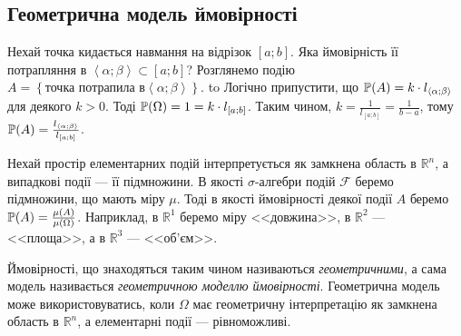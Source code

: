 \subsection{Геометрична модель ймовірності}
\begin{example}
    Нехай точка кидається навмання на відрізок $\left[a; b\right]$. 
    Яка ймовірність її 
    потрапляння в $\left<\alpha; \beta\right> \subset  \left[a; b\right]$?
    Розглянемо подію $A = \left\{ 
        \text{точка потрапила в} \left<\alpha; \beta\right>
    \right\}$.
    \newline
    \hbox to 
    Логічно припустити, що $\P(A) = k\cdot l_{\left<\alpha; \beta\right>}$ для деякого $k > 0$.
    Тоді $\P(\Omega) = 1 = k\cdot l_{\left[a; b\right]}$. Таким чином, 
    $k = \frac{1}{l_{\left[a; b\right]}} = \frac{1}{b-a}$,
    тому $\P(A) = \frac{l_{\left<\alpha; \beta\right>}}{l_{\left[a; b\right]}}$.
\end{example}
Нехай простір елементарних подій інтерпретується як замкнена область в 
$ \mathbb{R} ^n$, а випадкові події --- її підмножини. В якості $\sigma$-алгебри 
подій $\mathcal{F}$ беремо підмножини, що мають міру $\mu$. Тоді в якості ймовірності 
деякої події $A$ беремо $\P(A) = \frac{\mu(A)}{\mu(\Omega)}$. 
Наприклад, в $\mathbb{R}^1$ беремо міру <<довжина>>, в $\mathbb{R}^2$ --- <<площа>>, а в $\mathbb{R}^3$ --- <<об'єм>>.

Ймовірності, що знаходяться таким чином називаються \emph{геометричними}, а сама модель 
називається \emph{геометричною моделлю ймовірності}.
Геометрична модель може використовуватись, 
коли $\Omega$ має геометричну інтерпретацію як замкнена область в $\mathbb{R}^n$,
а елементарні події --- рівноможливі.

